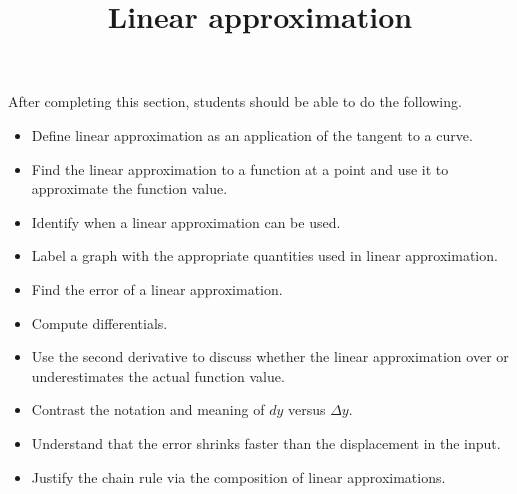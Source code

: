 \documentclass{ximera}
\title{Linear approximation}
\begin{document}
\begin{abstract}
\end{abstract}

\maketitle

\begin{sectionOutcomes}

After completing this section, students should be able to do the following.

\begin{itemize}
	\item Define linear approximation as an application of the tangent to a curve.
	\item Find the linear approximation to a function at a point and use it to approximate the function value.
	\item Identify when a linear approximation can be used.
	\item Label a graph with the appropriate quantities used in linear approximation.
	\item Find the error of a linear approximation.
          \item Compute differentials.
	\item Use the second derivative to discuss whether the linear approximation over or underestimates the actual function value.
	\item Contrast the notation and meaning of $dy$ versus $\Delta y$.
	\item Understand that the error shrinks faster than the displacement in the input.
        \item Justify the chain rule via the composition of linear approximations.
\end{itemize}

\end{sectionOutcomes}
\end{document}

